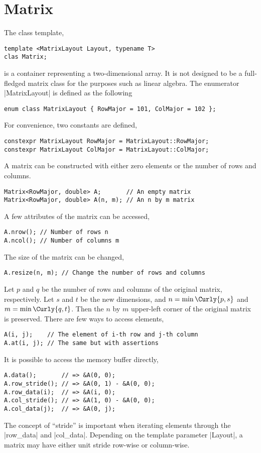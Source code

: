 \section{Matrix}
\label{sec:Matrix}

The class template,
\begin{verbatim}
template <MatrixLayout Layout, typename T>
clas Matrix;
\end{verbatim}
is a container representing a two-dimensional array. It is not designed to be a
full-fledged matrix class for the purposes such as linear algebra. The
enumerator |MatrixLayout| is defined as the following
\begin{verbatim}
enum class MatrixLayout { RowMajor = 101, ColMajor = 102 };
\end{verbatim}
For convenience, two constants are defined,
\begin{verbatim}
constexpr MatrixLayout RowMajor = MatrixLayout::RowMajor;
constexpr MatrixLayout ColMajor = MatrixLayout::ColMajor;
\end{verbatim}

A matrix can be constructed with either zero elements or the number of rows and
columns.
\begin{verbatim}
Matrix<RowMajor, double> A;       // An empty matrix
Matrix<RowMajor, double> A(n, m); // An n by m matrix
\end{verbatim}
A few attributes of the matrix can be accessed,
\begin{verbatim}
A.nrow(); // Number of rows n
A.ncol(); // Number of columns m
\end{verbatim}
The size of the matrix can be changed,
\begin{verbatim}
A.resize(n, m); // Change the number of rows and columns
\end{verbatim}
Let $p$ and $q$ be the number of rows and columns of the original matrix,
respectively. Let $s$ and $t$ be the new dimensions, and $n = \min\Curly{p, s}$
and $m = \min\Curly{q, t}$. Then the $n$ by $m$ upper-left corner of the
original matrix is preserved. There are few ways to access elements,
\begin{verbatim}
A(i, j);    // The element of i-th row and j-th column
A.at(i, j); // The same but with assertions
\end{verbatim}
It is possible to access the memory buffer directly,
\begin{verbatim}
A.data();       // => &A(0, 0);
A.row_stride(); // => &A(0, 1) - &A(0, 0);
A.row_data(i);  // => &A(i, 0);
A.col_stride(); // => &A(1, 0) - &A(0, 0);
A.col_data(j);  // => &A(0, j);
\end{verbatim}
The concept of ``stride'' is important when iterating elements through the
|row_data| and |col_data|. Depending on the template parameter |Layout|, a
matrix may have either unit stride row-wise or column-wise.

